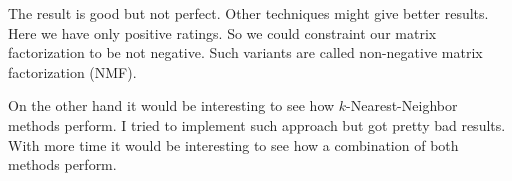 \documentclass[DIV=14,twocolumn]{scrartcl}
\begin{document}
The result is good but not perfect. Other techniques might give better results. Here we have only positive ratings. So we could constraint our matrix factorization to be not negative. Such variants are called non-negative matrix factorization (NMF).

On the other hand it would be interesting to see how $k$-Nearest-Neighbor methods perform. I tried to implement such approach but got pretty bad results. With more time it would be interesting to see how a combination of both methods perform.

{}

\end{document}
